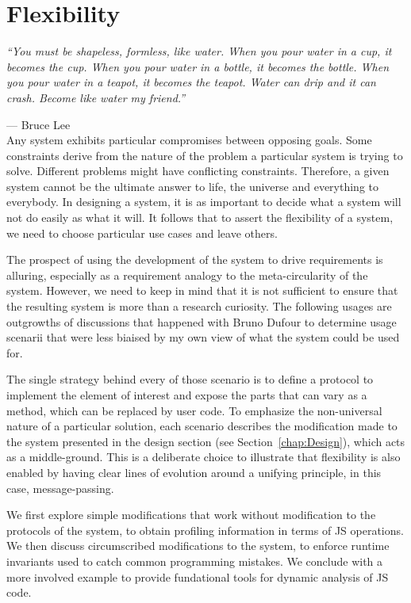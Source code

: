 \chapter{Flexibility}
\label{chap:Flexibility}

\emph{``You must be shapeless, formless, like water. When you pour water in a
cup, it becomes the cup. When you pour water in a bottle, it becomes the
bottle. When you pour water in a teapot, it becomes the teapot. Water can drip
and it can crash. Become like water my friend.''}

--- Bruce Lee \\

Any system exhibits particular compromises between opposing goals. Some
constraints derive from the nature of the problem a particular system is trying
to solve. Different problems might have conflicting constraints. Therefore, a
given system cannot be the ultimate answer to life, the universe and everything
to everybody. In designing a system, it is as important to decide what a system
will not do easily as what it will.  It follows that to assert the flexibility
of a system, we need to choose particular use cases and leave others.

The prospect of using the development of the system to drive requirements is
alluring, especially as a requirement analogy to the meta-circularity of the
system. However, we need to keep in mind that it is not sufficient to ensure
that the resulting system is more than a research curiosity. The following
usages are outgrowths of discussions that happened with Bruno Dufour to
determine usage scenarii that were less biaised by my own view of what the
system could be used for.

The single strategy behind every of those scenario is to define a protocol to
implement the element of interest and expose the parts that can vary as a
method, which can be replaced by user code. To emphasize the non-universal
nature of a particular solution, each scenario describes the modification made
to the system presented in the design section (see Section~\ref{chap:Design}),
which acts as a middle-ground.  This is a deliberate choice to illustrate that
flexibility is also enabled by having clear lines of evolution around a
unifying principle, in this case, message-passing.

We first explore simple modifications that work without modification to the
protocols of the system, to obtain profiling information in terms of JS operations.
We then discuss circumscribed modifications to the system, to enforce runtime
invariants used to catch common programming mistakes. We conclude with a more
involved example to provide fundational tools for dynamic analysis of JS code.


